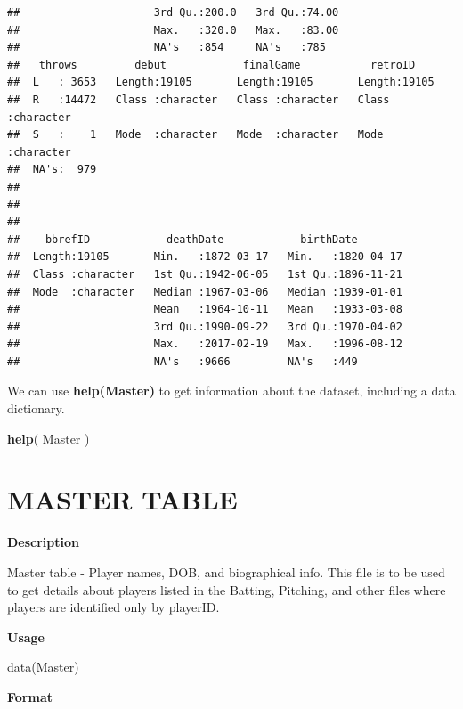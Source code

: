 \documentclass[]{book}
\newenvironment{Shaded}{\begin{snugshade}}{\end{snugshade}}
\newcommand{\KeywordTok}[1]{\textcolor[rgb]{0.13,0.29,0.53}{\textbf{#1}}}
\newcommand{\NormalTok}[1]{#1}
\theoremstyle{definition}
\theoremstyle{definition}
\theoremstyle{definition}
\theoremstyle{remark}
\begin{document}
\begin{verbatim}
##                     3rd Qu.:200.0   3rd Qu.:74.00               
##                     Max.   :320.0   Max.   :83.00               
##                     NA's   :854     NA's   :785                 
##   throws         debut            finalGame           retroID         
##  L   : 3653   Length:19105       Length:19105       Length:19105      
##  R   :14472   Class :character   Class :character   Class :character  
##  S   :    1   Mode  :character   Mode  :character   Mode  :character  
##  NA's:  979                                                           
##                                                                       
##                                                                       
##                                                                       
##    bbrefID            deathDate            birthDate         
##  Length:19105       Min.   :1872-03-17   Min.   :1820-04-17  
##  Class :character   1st Qu.:1942-06-05   1st Qu.:1896-11-21  
##  Mode  :character   Median :1967-03-06   Median :1939-01-01  
##                     Mean   :1964-10-11   Mean   :1933-03-08  
##                     3rd Qu.:1990-09-22   3rd Qu.:1970-04-02  
##                     Max.   :2017-02-19   Max.   :1996-08-12  
##                     NA's   :9666         NA's   :449
\end{verbatim}

We can use \textbf{help(Master)} to get information about the dataset,
including a data dictionary.

\begin{Shaded}
\begin{Highlighting}[]
\KeywordTok{help}\NormalTok{( Master )}
\end{Highlighting}
\end{Shaded}

\hypertarget{master-table}{%
\section{\texorpdfstring{\textbf{MASTER
TABLE}}{MASTER TABLE}}\label{master-table}}

\textbf{Description}

Master table - Player names, DOB, and biographical info. This file is to
be used to get details about players listed in the Batting, Pitching,
and other files where players are identified only by playerID.

\textbf{Usage}

data(Master)

\textbf{Format}
\end{document}

